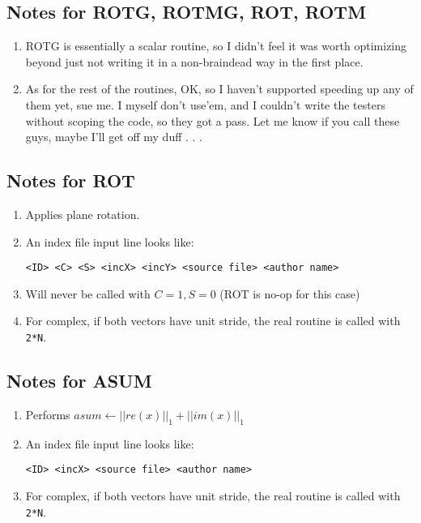 \documentclass[11pt]{article}
\begin{document}
\subsection{Notes for ROTG, ROTMG, ROT, ROTM}
\begin{enumerate}
\item
ROTG is essentially a scalar routine, so I didn't feel it was worth
optimizing beyond just not writing it in a non-braindead way in the first
place.

\item
As for the rest of the routines, OK, so I haven't supported speeding up
any of them yet, sue me.
I myself don't use'em, and I couldn't write the testers without scoping
the code, so they got a pass.  Let me know if you call these guys, maybe
I'll get off my duff . . .
\end{enumerate}

\subsection{Notes for ROT}
\begin{enumerate}
\item Applies plane rotation.
\item
An index file input line looks like:
\begin{verbatim}
<ID> <C> <S> <incX> <incY> <source file> <author name>
\end{verbatim}
\item Will never be called with $C = 1, S = 0$ (ROT is no-op for this case)
\item For complex, if both vectors have unit stride, the real routine is
      called with {\tt 2*N}.
\end{enumerate}

\subsection{Notes for ASUM}
\begin{enumerate}
\item Performs $asum \leftarrow || re( x ) || _ {1}  + || im( x ) || _ {1} $
\item
An index file input line looks like:
\begin{verbatim}
<ID> <incX> <source file> <author name>
\end{verbatim}
\item For complex, if both vectors have unit stride, the real routine is
      called with {\tt 2*N}.
\end{enumerate}
\end{document}
